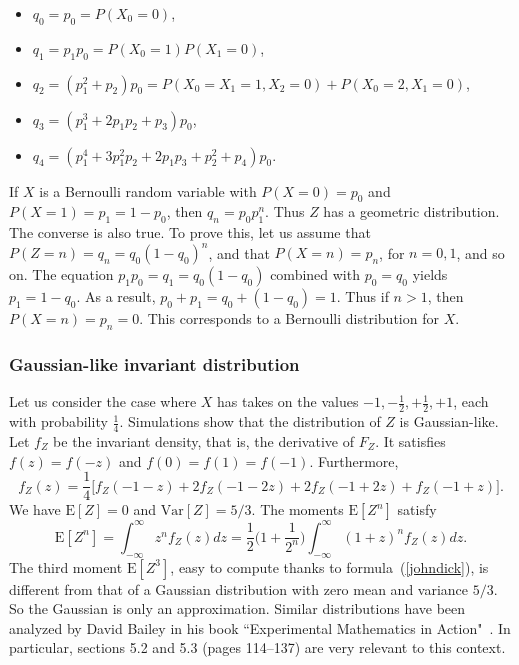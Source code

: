 \documentclass[oneside,10pt]{book}
\begin{document}
\begin{itemize}
\item $q_0 = p_0 =P(X_0=0)$,
\item $q_1 = p_1p_0 = P(X_0=1)P(X_1=0)$,
\item $q_2 = (p_1^2+p_2)p_0 =P(X_0=X_1=1, X_2=0)+P(X_0=2, X_1=0)$,
\item $q_3 = (p_1^3+2p_1p_2 +p_3)p_0$,
\item $q_4 = (p_1^4+ 3p_1^2p_2 + 2p_1p_3+p_2^2 + p_4)p_0$.
\end{itemize}\vspace{1ex}

\noindent If $X$ is a Bernoulli random variable with $P(X=0) = p_0$ and $P(X=1)=p_1 = 1-p_0$, then $q_n= p_0 p_1^n$. Thus 
 $Z$ has a \textcolor{index}{geometric distribution}.
The converse is also true.
To prove this, let us assume that $P(Z = n) = q_n = q_0 (1 - q_0)^n$, and that $P(X = n) = p_n$, for $n = 0, 1$, and so on. 
The equation $p_1p_0 = q_1 =  q_0(1-q_0)$ combined with $p_0 = q_0$ yields $p_1 = 1 - q_0$.  
As a result, $p_0 + p_1 = q_0 + (1 - q_0) = 1$. Thus if $n > 1$, then $P(X = n) = p_n = 0$. 
This corresponds to a Bernoulli distribution for $X$. 

\subsubsection{Gaussian-like invariant distribution}

Let us consider the case where $X$ has takes on the values $-1,-\frac{1}{2},+\frac{1}{2},+1$, each with probability $\frac{1}{4}$. 
Simulations show that the distribution of $Z$ is Gaussian-like. Let $f_Z$ be the invariant density, that is, the derivative of $F_Z$.
It satisfies $f(z) = f(-z)$ and $f(0)=f(1)=f(-1)$. Furthermore,
$$
f_Z(z)= \frac{1}{4} \Big[f_Z(-1-z) + 2f_Z(-1-2z) + 2f_Z(-1+2z) + f_Z(-1+z) \Big] .
$$
We have $\text{E}[Z]=0$ and $\text{Var}[Z]=5/3$. The moments $\text{E}[Z^n]$ satisfy
$$
\text{E}[Z^n] = \int_{-\infty}^\infty z^n f_Z(z)dz = \frac{1}{2}\Big(1+\frac{1}{2^n}\Big)\int_{-\infty}^\infty (1+z)^n f_Z(z)dz.
$$
The third moment $\text{E}[Z^3]$, easy to compute thanks to formula~(\ref{johndick}), is different from that of  
 a Gaussian distribution with zero mean and variance $5/3$. So the Gaussian is only an approximation.
Similar distributions have been analyzed by David Bailey in his book ``Experimental Mathematics in Action"~\cite{nt1}. In particular, sections 5.2 and 5.3 (pages 114--137) are very relevant to this context.  
\end{document}
